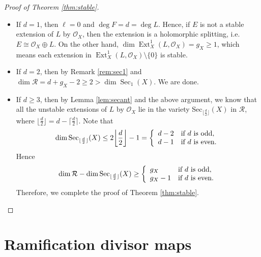 \documentclass[12pt]{article}
\begin{document}
\begin{proof}[Proof of Theorem \ref{thm:stable}]
\begin{itemize}
\item If $d =1$, then $\ell = 0$ and $\deg F = d = \deg L$. Hence, if $E$ is not a stable extension of $L$ by $\mathcal O_{X}$, then the extension is a holomorphic splitting, i.e. $E \cong \mathcal O_{X} \oplus L$. On the other hand, $\dim \operatorname{Ext}_{X}^{1} (L, \mathcal O_{X}) = g_{X} \geq 1$, which means each extension in $\operatorname{Ext}_{X}^{1} (L, \mathcal O_{X}) \setminus \{ 0 \}$ is stable.
\item If $d = 2$, then by Remark \ref{rem:sec1} and $\dim \mathcal R = d + g_{X} - 2 \geq 2 > \dim \operatorname{Sec}_{1}(X)$. We are done.
\item If $d \geq 3$, then by Lemma \ref{lem:secant} and the above argument, we know that all the unstable extensions of $L$ by $\mathcal O_{X}$ lie in the variety Sec$_{\lfloor \frac{d}{2} \rfloor}(X)$ in $\mathcal R$, where $\lfloor \frac{d}{2} \rfloor = d - \lceil \frac{d}{2} \rceil$. Note that
\[ \dim {\rm Sec}_{\lfloor \frac{d}{2} \rfloor}(X) \leq 2 {\left \lfloor \frac{d}{2} \right\rfloor} - 1 = \left\{ \begin{array}{ll}
d - 2 & \text{if $d$ is odd}, \\
d - 1 & \text{if $d$ is even}.
\end{array} \right. \]
Hence
\[ \dim \mathcal R - \dim {\rm Sec}_{\lfloor \frac{d}{2} \rfloor}(X) \geq \left\{ \begin{array}{ll}
g_{X} & \text{if $d$ is odd}, \\
g_{X} - 1 & \text{if $d$ is even}.
\end{array} \right. \]
Therefore, we complete the proof of Theorem \ref{thm:stable}. \qedhere
\end{itemize}
\end{proof}


\section{Ramification divisor maps}
\label{sec:ramidivmap}
\end{document}
